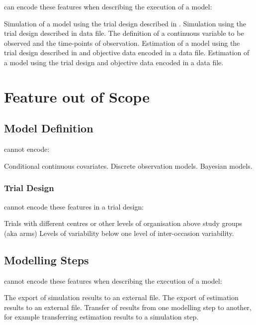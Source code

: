 \pharmml can encode these features when describing the execution of a model:
\begin{features}
\feat Simulation of a model using the trial design described in \pharmml.
\feat Simulation using the trial design described in data file.
\feat The definition of a continuous variable to be observed and the time-points of observation.
\feat Estimation of a model using the trial design described in \pharmml and objective data encoded in a data file.
\feat Estimation of a model using the trial design and objective data encoded in a data file.
\end{features}

\section{Feature out of Scope}

\subsection{Model Definition}

\pharmml cannot encode:
\begin{features}
\feat Conditional continuous covariates.
\feat Discrete observation models.
\feat Bayesian models.
\end{features}


\subsubsection{Trial Design}

\pharmml cannot encode these features in a trial design:
\begin{features}
\feat Trials with different centres or other levels of organisation above study groups (aka arms)
\feat Levels of variability below one level of inter-occasion variability.
\end{features}

\subsection{Modelling Steps}

\pharmml cannot encode these features when describing the execution of a model:
\begin{features}
\feat The export of simulation results to an external file.
\feat  The export of estimation results to an external file.
\feat Transfer of results from one modelling step to another, for example transferring estimation results to a simulation step.
\end{features}

